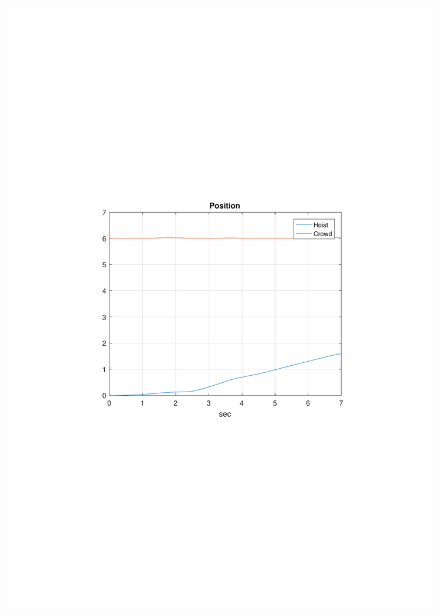 \documentclass[table]{beamer}
\begin{document}
\begin{frame}[c]
\begin{columns}[c]
\begin{figure}
			\includegraphics[trim=4cm 9cm 4cm 9.5cm, clip=true, width=\linewidth]{img/Example2_Position}
		\end{figure}
	\end{columns}
\end{frame}
\end{document}
